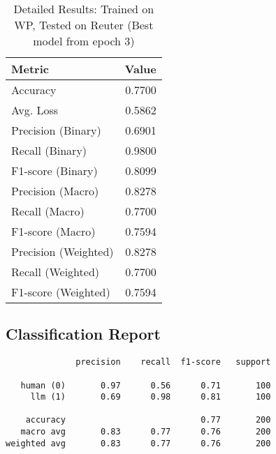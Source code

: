 \documentclass{article}
\begin{document}
\begin{table}[htbp]
\centering
\caption*{Detailed Results: Trained on WP, Tested on Reuter (Best model from epoch 3)}
\begin{tabular}{@{}lr@{}}
\toprule
Metric & Value \\
\midrule
Accuracy & 0.7700 \\
Avg. Loss & 0.5862 \\
Precision (Binary) & 0.6901 \\
Recall (Binary) & 0.9800 \\
F1-score (Binary) & 0.8099 \\
Precision (Macro) & 0.8278 \\
Recall (Macro) & 0.7700 \\
F1-score (Macro) & 0.7594 \\
Precision (Weighted) & 0.8278 \\
Recall (Weighted) & 0.7700 \\
F1-score (Weighted) & 0.7594 \\
\bottomrule
\end{tabular}
\subsection*{Classification Report}
\begin{verbatim}
              precision    recall  f1-score   support

   human (0)       0.97      0.56      0.71       100
     llm (1)       0.69      0.98      0.81       100

    accuracy                           0.77       200
   macro avg       0.83      0.77      0.76       200
weighted avg       0.83      0.77      0.76       200
\end{verbatim}
\end{table}
\end{document}
